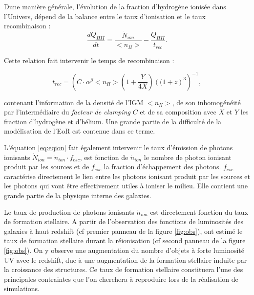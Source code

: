 Dune manière générale, l'évolution de la fraction d'hydrogène ionisée dans l'Univers, dépend de la balance entre le taux d'ionisation et le taux recombinaison \citep{0004-637X-514-2-648, RevModPhys.81.1405} :
\begin{equation}
\frac{dQ_{HII}}{dt} = \frac{\dot{N}_{ion}}{ <n_H>} - \frac{Q_{HII}}{t_{rec}}.
\label{eq:eqion}
\end{equation}

Cette relation fait intervenir le temps de recombinaison :

\begin{equation}
t_{rec} = \left( C\cdot \alpha^\beta <n_H> \left( 1+\frac{Y}{4X}\right) \left((1+z\right)^3  \right)^{-1}, 
\end{equation}

contenant l'information de la densité de l'\ac{IGM} $<n_H>$, de son inhomogénéité par l'intermédiaire du \textit{facteur de clumping} $C$ et de sa composition avec $X$ et $Y$ les fraction d'hydrogène et d'hélium.
Une grande partie de la difficulté de la modélisation de l'\ac{EoR} est contenue dans ce terme.

L'équation \ref{eq:eqion} fait également intervenir le taux d'émission de photons ionisants $\dot{N}_{ion}= \dot{n}_{ion} \cdot f_{esc}$, est fonction de $\dot{n}_{ion}$ le nombre de photon ionisant produit par les sources et de $f_{esc}$ la fraction d'échappement des photons. 
$f_{esc}$ caractérise directement le lien entre les photons ionisant produit par les sources et les photons qui vont être effectivement utiles à ioniser le milieu.
Elle contient une grande partie de la physique interne des galaxies.

Le taux de production de photons ionisants $\dot{n}_{ion}$ est directement fonction du taux de formation stellaire.
A partir de l'observation des fonctions de luminosités des galaxies à haut redshift (cf premier panneau de la figure \ref{fig:obs}), \cite{bouwens_reionization_2015} ont estimé le taux de formation stellaire durant la réionisation (cf second panneau de la figure \ref{fig:obs}).
On y observe une augmentation du nombre d'objets à forte luminosité UV avec le redshift, due à une augmentation de la formation stellaire induite par la croissance des structures.
Ce taux de formation stellaire constituera l'une des principales contraintes que l'on cherchera à reproduire lors de la réalisation de simulations.





